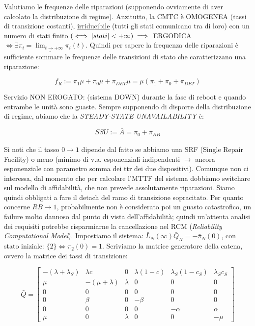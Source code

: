 Valutiamo le frequenze delle riparazioni (supponendo ovviamente di aver calcolato la distribuzione di regime). Anzitutto, la CMTC è OMOGENEA (tassi di transizione costanti), \underline{irriducibile} (tutti gli stati comunicano tra di loro) con un numero di stati finito $(\iff \left\vert{stati}\right\vert<+\infty) \implies$ ERGODICA $\iff \underline{\exists \pi_i=\lim_{t\to +\infty}{\pi_i(t)}}$. Quindi per sapere la frequenza delle riparazioni è sufficiente sommare le frequenze delle transizioni di stato che caratterizzano una riparazione:

\[
	f_R := \pi_1\mu + \pi_0\mu + \pi_{DET}\mu = \mu(\pi_1+\pi_0+\pi_{DET})
\]

Servizio NON EROGATO: (sistema DOWN) durante la fase di reboot e quando entrambe le unità sono guaste. Sempre supponendo di disporre della distribuzione di regime, abiamo che la \textit{STEADY-STATE UNAVAILABILITY} è:

\[
	SSU := \underline{\bar{A} = \pi_0+\pi_{RB}}
\]

Si noti che il tasso $0\rightarrow 1$ dipende dal fatto se abbiamo una SRF (Single Repair Facility) o meno (minimo di v.a. esponenziali indipendenti $\rightarrow$ ancora esponenziale con parametro somma dei ttr dei due dispositivi). Comunque non ci interessa, dal momento che per calcolare l'MTTF del sistema dobbiamo switchare sul modello di affidabilità, che non prevede assolutamente riparazioni. Siamo quindi obbligati a fare il detach del ramo di transizione sopracitato. Per quanto concerne $RB\rightarrow 1$, probabilmente non è considerato poi un guasto catastrofico, un failure molto dannoso dal punto di vista dell'affidabilità; quindi un'attenta analisi dei requisiti potrebbe risparmiarne la cancellazione nel RCM (\textit{Reliability Computational Model}). Impostiamo il sistema: $\bar{L}_N(\infty)\bar{Q}_N = -\bar{\pi}_N(0)$, con stato iniziale: $\{2\} \iff \pi_2(0)=1$. Scriviamo la matrice generatore della catena, ovvero la matrice dei tassi di transizione:

\[
	\bar{Q} = \begin{bmatrix}-(\lambda+\lambda_S)&\lambda c&0&\lambda(1-c)&\lambda_S(1-c_S)&\lambda_S c_S\\ \mu&-(\mu+\lambda)&\lambda&0&0&0\\0&0&0&0&0&0\\0&\beta&0&-\beta&0&0\\0&0&0&0&-\alpha&\alpha\\ \mu&0&\lambda&0&0&-\mu\end{bmatrix}
\]

